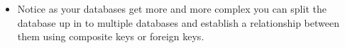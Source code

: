 \begin{itemize}
    \item Notice as your databases get more and more complex you can split the database up in to multiple databases and establish a relationship between them using composite keys or foreign keys.
\end{itemize}


